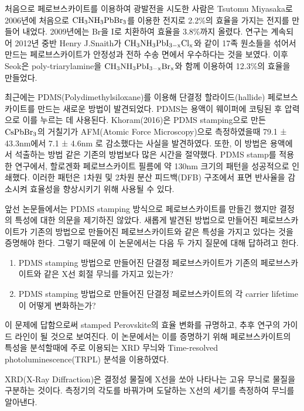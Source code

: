 처음으로 페로브스카이트를 이용하여 광발전을 시도한 사람은 Tsutomu Miyasaka로 2006년에 처음으로 $\rm{CH_3NH_3PbBr_3}$를 이용한 전지로 2.2\%의 효율을 가지는 전지를 만들어 내었다\cite{kojima2006novel}. 2009년에는 Br을 I로 치환하여 효율을 3.8\%까지 올렸다\cite{kojima2009organometal}. 연구는 계속되어 2012년 중반 Henry J.Snaith가  $\rm{CH_{3}NH_3PbI_{3-x}Cl_x}$와 같이 17족 원소들을 섞어서 만드는 페로브스카이트가 안정성과 전하 수송 면에서 우수하다는 것을 보였다\cite{lee2012efficient}. 이후 Seok은 poly-triarylamine을 $\rm{CH_{3}NH_3PbI_{3-x}Br_x}$와 함께 이용하여 12.3\%의 효율을 만들었다\cite{noh2013chemical}.

최근에는 PDMS(Polydimethylsiloxane)를 이용해 단결정 할라이드(hallide) 페로브스카이트를 만드는 새로운 방법이 발견되었다. PDMS는 용액이 웨이퍼에 코팅된 후 압력으로 이를 누르는 데 사용된다. Khoram(2016)은 PDMS stamping으로 만든 $\rm{CsPbBr_3}$의 거칠기가  AFM(Atomic Force Microscopy)으로 측정하였을때 79.1 ± 43.3nm에서 7.1 ± 4.6nm 로 감소했다는 사실을 발견하였다\cite{khoram2016growth}. 또한, 이 방법은 용액에서 석출하는 방법 같은 기존의 방법보다 많은 시간을 절약했다. PDMS stamp를 적용한 연구에서, 할로겐화 페로브스카이트 필름에 약 130nm 크기의 패턴을 성공적으로 인쇄했다\cite{brittman2017controlling}. 이러한 패턴은 1차원 및 2차원 분산 피드백(DFB) 구조에서 표면 반사율을 감소시켜 효율성을 향상시키기 위해 사용될 수 있다.

앞선 논문들에서는 PDMS stamping 방식으로 페로브스카이트를 만들긴 했지만 결정의 특성에 대한 의문을 제기하진 않았다. 새롭게 발견된 방법으로 만들어진 페로브스카이트가 기존의 방법으로 만들어진 페로브스카이트와 같은 특성을 가지고 있다는 것을 증명해야 한다. 그렇기 때문에 이 논문에서는 다음 두 가지 질문에 대해 답하려고 한다.

\begin{enumerate}
	\item PDMS stamping 방법으로 만들어진 단결정 페로브스카이트가 기존의 페로브스카이트와 같은 X선 회절 무늬를 가지고 있는가?
	\item PDMS stamping 방법으로 만들어진 단결정 페로브스카이트의 각 carrier lifetime이 어떻게 변화하는가?
\end{enumerate}

이 문제에 답함으로써 stamped Perovskite의 효율 변화를 규명하고, 추후 연구의 가이드 라인이 될 것으로 보여진다. 이 논문에서는 이를 증명하기 위해 페로브스카이트의 특성을 분석할때에 주로 이용되는 XRD 무늬와 Time-resolved photoluminescence(TRPL) 분석을 이용하였다.

XRD(X-Ray Diffraction)은 결정성 물질에 X선을 쏘아 나타나는 고유 무늬로 물질을 구분하는 것이다. 측정기의 각도를 바꿔가며 도달하는 X선의 세기를 측정하여 무늬를 알아낸다. 

